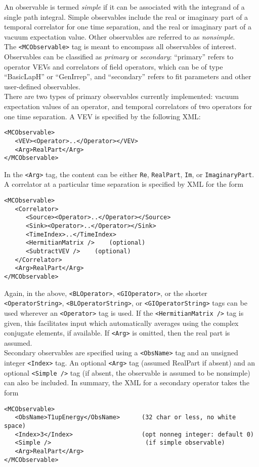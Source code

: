 \documentclass[12pt]{article}
\newcommand{\vb}{\texttt}
\begin{document}
An observable is termed \textit{simple} if it can be associated with
the integrand of a single path integral.  Simple observables include
the real or imaginary part of a temporal correlator
for one time separation, and the real or imaginary part of a vacuum
expectation value.  Other observables are referred to as \textit{nonsimple}.\\

The \vb{<MCObservable>} tag is meant to encompass all observables
of interest.  Observables can be classified as \textit{primary} or
\textit{secondary}:  ``primary'' refers to operator VEVs and correlators of
field operators, which can be of type ``BasicLapH'' or ``GenIrrep'', and
``secondary'' refers to fit parameters and other user-defined
observables.\\

There are two types of primary observables currently implemented: vacuum
expectation values of an operator, and temporal correlators of two
operators for one time separation.  A VEV is specified by the following XML:
\begin{verbatim}
<MCObservable>
   <VEV><Operator>..</Operator></VEV>
   <Arg>RealPart</Arg>
</MCObservable>
\end{verbatim}
In the \vb{<Arg>} tag, the content can be either \vb{Re},
\vb{RealPart}, \vb{Im}, or \vb{ImaginaryPart}.
A correlator at a particular time separation is specified by XML for the form
\begin{verbatim}
<MCObservable>
   <Correlator>
      <Source><Operator>..</Operator></Source>
      <Sink><Operator>..</Operator></Sink>
      <TimeIndex>..</TimeIndex>
      <HermitianMatrix />    (optional)
      <SubtractVEV />    (optional)
   </Correlator>
   <Arg>RealPart</Arg>
</MCObservable>
\end{verbatim}
Again, in the above,  \vb{<BLOperator>}, \vb{<GIOperator>}, or the shorter
\vb{<OperatorString>}, \vb{<BLOperatorString>}, or
\vb{<GIOperatorString>} tags can be used wherever an \vb{<Operator>}
tag is used. If the \vb{<HermitianMatrix />} tag is given, this facilitates
input which automatically averages using the complex
conjugate elements, if available.  If \vb{<Arg>} is omitted, then
the real part is assumed.\\

Secondary observables are specified using a \vb{<ObsName>} tag and
an unsigned integer \vb{<Index>} tag.  An optional \vb{<Arg>} tag
(assumed RealPart if absent) and an optional \vb{<Simple />}
tag (if absent, the observable is assumed to be nonsimple) can also
be included.   In summary, the XML for a secondary operator takes the form
\begin{verbatim}
<MCObservable>
   <ObsName>T1upEnergy</ObsName>      (32 char or less, no white space)
   <Index>3</Index>                   (opt nonneg integer: default 0)
   <Simple />                          (if simple observable)
   <Arg>RealPart</Arg>
</MCObservable>
\end{verbatim}
\end{document}
